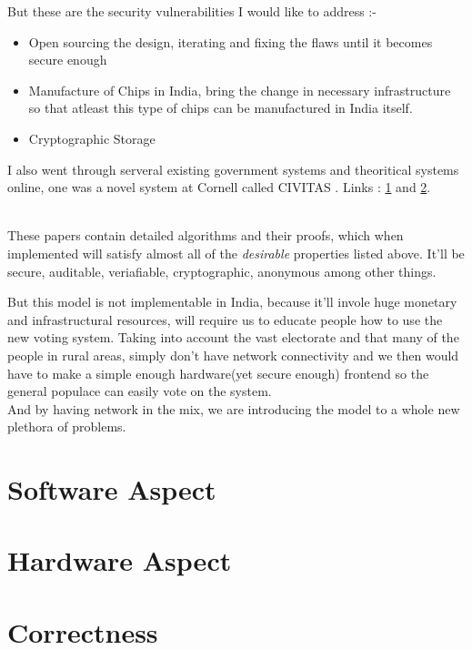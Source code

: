 \documentclass[12pt]{report}
\begin{document}
\label{sec:addr}
But these are the security vulnerabilities I would like to address :- 
\begin{itemize}
  \item Open sourcing the design, iterating and fixing the flaws until it becomes secure enough
  \item Manufacture of Chips in India, bring the change in necessary infrastructure so that atleast this type of chips can be manufactured in India itself.
  \item Cryptographic Storage
\end{itemize}

I also went through serveral existing government systems and theoritical systems online, one was a novel system at Cornell called CIVITAS . Links : \href{https://www.cs.cornell.edu/projects/civitas/papers/clarkson_civitas.pdf}{1} and \href{https://www.cs.cornell.edu/~clarkson/papers/clarkson_civitas_tr.pdf}{2}.

\vspace{0.5cm}

\\
These papers contain detailed algorithms and their proofs, which when implemented will satisfy almost all of the \textit{desirable} properties listed above. It'll be secure, auditable, veriafiable, cryptographic, anonymous among other things.
\\

\vspace{0.5cm}

But this model is not implementable in India, because it'll invole huge monetary and infrastructural resources, will require us to educate people how to use the new voting system. Taking into account the vast electorate and that many of the people in rural areas, simply don't have network connectivity and we then would have to make a simple enough hardware(yet secure enough) frontend so the general populace can easily vote on the system. 
\\
And by having network in the mix, we are introducing the model to a whole new plethora of problems.

\section{Software Aspect}
\section{Hardware Aspect}
\section{Correctness}
\end{document}
